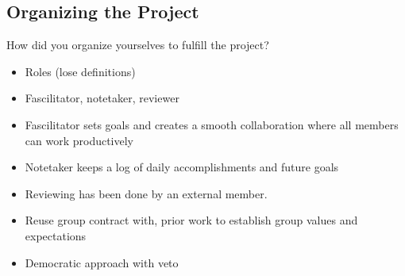 \subsection{Organizing the Project}

How did you organize yourselves to fulfill the project?

\begin{itemize}
	\item Roles (lose definitions)
	\item Fascilitator, notetaker, reviewer
	\item Fascilitator sets goals and creates a smooth collaboration where all members can work productively
	\item Notetaker keeps a log of daily accomplishments and future goals 
	\item Reviewing has been done by an external member. 
	\item Reuse group contract with, prior work to establish group values and expectations 
	\item Democratic approach with veto 
\end{itemize}


